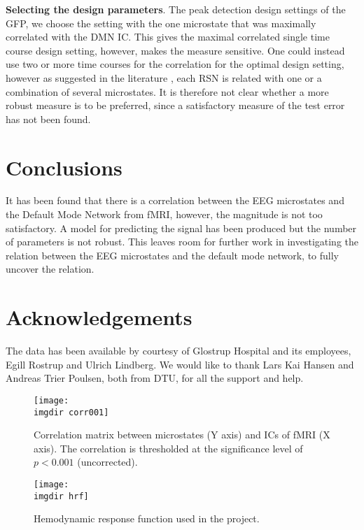 \documentclass{article}
\newcommand{\imgdir}{Images/} %
\begin{document}
\textbf{Selecting the design parameters}. The peak detection design settings of the GFP, we choose the setting with the one microstate that was maximally correlated with the DMN IC. This gives the maximal correlated single time course design setting, however,  makes the measure sensitive. One could instead use two or more time courses for the correlation for the optimal design setting, however as suggested in the literature \cite{Yuan20122062}, each RSN is related with one or a combination of several microstates. It is therefore not clear whether a more robust measure is to be preferred, since a satisfactory measure of the test error has not been found.


\section{Conclusions}
It has been found that there is a correlation between the EEG microstates and the Default Mode Network from fMRI, however, the magnitude is not too satisfactory. A model for predicting the signal has been produced but the number of parameters is not robust. This leaves room for further work in investigating the relation between the EEG microstates and the default mode network, to fully uncover the relation.

\section{Acknowledgements}
The data has been available by courtesy of Glostrup Hospital and its employees, Egill Rostrup and Ulrich Lindberg. We would like to thank Lars Kai Hansen and
Andreas Trier Poulsen, both from DTU, for all the support and help.



\begin{figure}[!ht]
    \centering
    \texttt{[image: \\imgdir corr001]}
    \caption{Correlation matrix between microstates (Y axis) and ICs of fMRI (X axis). The correlation is thresholded at the significance level of $p<0.001$ (uncorrected).}
    \label{fig:grid}
\end{figure}

\begin{figure}[!ht]
    \centering
    \texttt{[image: \\imgdir hrf]}
    \caption{Hemodynamic response function used in the project.}
    \label{fig:hrf}
\end{figure}
\end{document}
